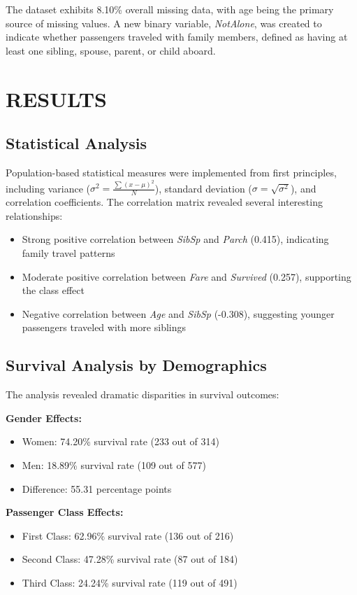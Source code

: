 \documentclass[letterpaper, 10 pt, conference]{ieeeconf}  %
\begin{document}
The dataset exhibits 8.10\% overall missing data, with age being the primary source of missing values. A new binary variable, \textit{NotAlone}, was created to indicate whether passengers traveled with family members, defined as having at least one sibling, spouse, parent, or child aboard.

\section{RESULTS}

\subsection{Statistical Analysis}

Population-based statistical measures were implemented from first principles, including variance ($\sigma^2 = \frac{\sum(x - \mu)^2}{N}$), standard deviation ($\sigma = \sqrt{\sigma^2}$), and correlation coefficients. The correlation matrix revealed several interesting relationships:

\begin{itemize}
\item Strong positive correlation between \textit{SibSp} and \textit{Parch} (0.415), indicating family travel patterns
\item Moderate positive correlation between \textit{Fare} and \textit{Survived} (0.257), supporting the class effect
\item Negative correlation between \textit{Age} and \textit{SibSp} (-0.308), suggesting younger passengers traveled with more siblings
\end{itemize}

\subsection{Survival Analysis by Demographics}

The analysis revealed dramatic disparities in survival outcomes:

\textbf{Gender Effects:}
\begin{itemize}
\item Women: 74.20\% survival rate (233 out of 314)
\item Men: 18.89\% survival rate (109 out of 577)
\item Difference: 55.31 percentage points
\end{itemize}

\textbf{Passenger Class Effects:}
\begin{itemize}
\item First Class: 62.96\% survival rate (136 out of 216)
\item Second Class: 47.28\% survival rate (87 out of 184)
\item Third Class: 24.24\% survival rate (119 out of 491)
\end{itemize}
\end{document}
